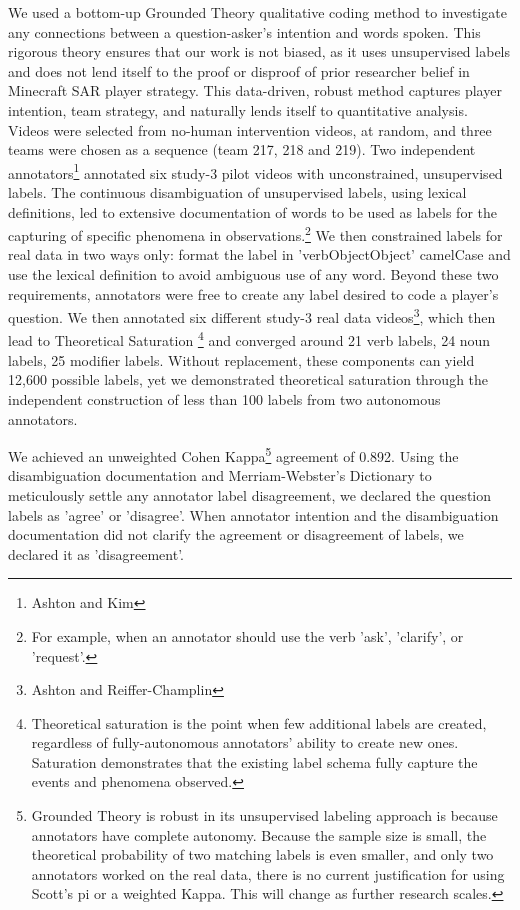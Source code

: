 We used a bottom-up Grounded Theory qualitative coding method to investigate
any connections between a question-asker's intention and words spoken. This
rigorous theory ensures that our work is not biased, as it uses unsupervised
labels and does not lend itself to the proof or disproof of prior researcher
belief in Minecraft SAR player strategy. This data-driven, robust method
captures player intention, team strategy, and naturally lends itself to
quantitative analysis. Videos were selected from no-human intervention videos,
at random, and three teams were chosen as a sequence (team 217, 218 and 219).
Two independent annotators\footnote{Ashton and Kim} annotated six study-3 pilot
videos with unconstrained, unsupervised labels. The continuous disambiguation
of unsupervised labels, using lexical definitions, led to extensive
documentation of words to be used as labels for the capturing of specific
phenomena in observations.\footnote{For example, when an annotator should use
the verb 'ask', 'clarify', or 'request'.} We then constrained labels for real
data in two ways only: format the label in 'verbObjectObject' camelCase and use
the lexical definition to avoid ambiguous use of any word. Beyond these two
requirements, annotators were free to create any label desired to code a
player's question. We then annotated six different study-3 real data
videos\footnote{Ashton and Reiffer-Champlin}, which then lead to Theoretical
Saturation \footnote{Theoretical saturation is the point when few additional
labels are created, regardless of fully-autonomous annotators' ability to
create new ones. Saturation demonstrates that the existing label schema fully
capture the events and phenomena observed.} and converged around 21 verb
labels, 24 noun labels, 25 modifier labels. Without replacement, these
components can yield 12,600 possible labels, yet we demonstrated theoretical
saturation through the independent construction of less than 100 labels from
two autonomous annotators.

We achieved an unweighted Cohen Kappa\footnote{Grounded Theory is robust in its
unsupervised labeling approach is because annotators have complete autonomy.
Because the sample size is small, the theoretical probability of two matching
labels is even smaller, and only two annotators worked on the real data, there
is no current justification for using Scott's pi or a weighted Kappa. This will
change as further research scales.} agreement of 0.892. Using the
disambiguation documentation and Merriam-Webster's Dictionary to meticulously
settle any annotator label disagreement, we declared the question labels as
'agree' or 'disagree'. When annotator intention and the disambiguation
documentation did not clarify the agreement or disagreement of labels, we
declared it as 'disagreement'. 


